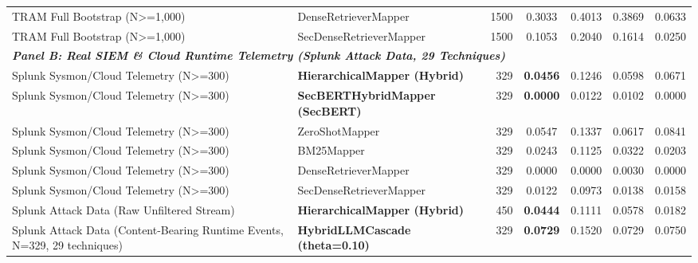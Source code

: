\begin{table}[t]
\begin{tabular}{llrcccc}
TRAM Full Bootstrap (N>=1,000) & DenseRetrieverMapper & 1500 & 0.3033 & 0.4013 & 0.3869 & 0.0633 \\
TRAM Full Bootstrap (N>=1,000) & SecDenseRetrieverMapper & 1500 & 0.1053 & 0.2040 & 0.1614 & 0.0250 \\
\midrule
\multicolumn{7}{l}{\textit{\textbf{Panel B: Real SIEM \& Cloud Runtime Telemetry (Splunk Attack Data, 29 Techniques)}}} \\
\midrule
Splunk Sysmon/Cloud Telemetry (N>=300) & \textbf{HierarchicalMapper (Hybrid)} & 329 & \textbf{0.0456} & 0.1246 & 0.0598 & 0.0671 \\
Splunk Sysmon/Cloud Telemetry (N>=300) & \textbf{SecBERTHybridMapper (SecBERT)} & 329 & \textbf{0.0000} & 0.0122 & 0.0102 & 0.0000 \\
Splunk Sysmon/Cloud Telemetry (N>=300) & ZeroShotMapper & 329 & 0.0547 & 0.1337 & 0.0617 & 0.0841 \\
Splunk Sysmon/Cloud Telemetry (N>=300) & BM25Mapper & 329 & 0.0243 & 0.1125 & 0.0322 & 0.0203 \\
Splunk Sysmon/Cloud Telemetry (N>=300) & DenseRetrieverMapper & 329 & 0.0000 & 0.0000 & 0.0030 & 0.0000 \\
Splunk Sysmon/Cloud Telemetry (N>=300) & SecDenseRetrieverMapper & 329 & 0.0122 & 0.0973 & 0.0138 & 0.0158 \\
Splunk Attack Data (Raw Unfiltered Stream) & \textbf{HierarchicalMapper (Hybrid)} & 450 & \textbf{0.0444} & 0.1111 & 0.0578 & 0.0182 \\
Splunk Attack Data (Content-Bearing Runtime Events, N=329, 29 techniques) & \textbf{HybridLLMCascade (theta=0.10)} & 329 & \textbf{0.0729} & 0.1520 & 0.0729 & 0.0750 \\
\bottomrule
\end{tabular}
\end{table}
